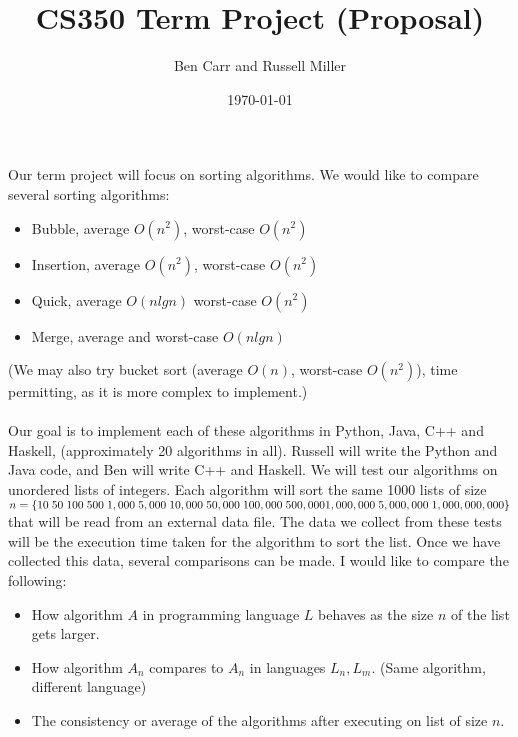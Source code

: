 \documentclass[12pt]{amsart}
\title{CS350 Term Project (Proposal)}
\author{Ben Carr and Russell Miller}
\date{\today} %
\begin{document}
\maketitle


\section*{}
\subsection*{}


Our term project will focus on sorting algorithms. We would like to compare several sorting algorithms:
\begin{itemize}
\item Bubble, average  $O(n^2)$, worst-case $O(n^2)$\\
\item Insertion, average $O(n^2)$, worst-case $O(n^2)$\\
\item Quick, average $O(n lg n)$ worst-case $O(n^2)$\\
\item Merge, average and worst-case $O(n lg n)$\\
\end{itemize}
(We may also try bucket sort (average $O(n)$, worst-case $O(n^2)$), time permitting, as it is more complex to implement.)\\ \\
Our goal is to implement each of these algorithms in Python, Java, C++ and Haskell, (approximately 20 algorithms in all). Russell will write the Python and Java code, and Ben will write C++ and Haskell. We will test our algorithms on unordered lists of integers. Each algorithm will sort the same 1000 lists of size \\
$n = \{10 \; 50 \; 100 \;500\; 1,000\; 5,000\; 10,000\; 50,000 \;100,000\; 500,000 \\1,000,000\; 5,000,000 \;1,000,000,000\}$ that will be read from an external data file. The data we collect from these tests will be the execution time taken for the algorithm to sort the list. Once we have collected this data, several comparisons can be made. I would like to compare the following:
\begin{itemize}
\item How algorithm $A$ in programming language $L$ behaves as the size $n$ of the list gets larger. \\
\item How algorithm $A_{n}$ compares to $A_{n}$ in languages $L_{n}, L_{m}$. (Same algorithm, different language)\\
\item The consistency or average of the algorithms after executing on list of size $n$. \\
\end{itemize}
\end{document}
